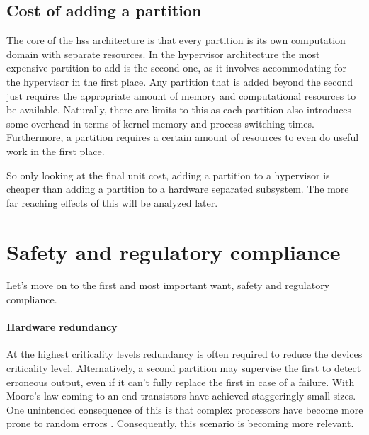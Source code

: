 \subsection{Cost of adding a partition}
The core of the \acrshort{hss} architecture is that every partition is its own computation domain with separate resources. In the hypervisor architecture the most expensive partition to add is the second one, as it involves accommodating for the hypervisor in the first place. Any partition that is added beyond the second just requires the appropriate amount of memory and computational resources to be available. Naturally, there are limits to this as each partition also introduces some overhead in terms of kernel memory and process switching times.  Furthermore, a partition requires a certain amount of resources to even do useful work in the first place.


So only looking at the final unit cost, adding a partition to a hypervisor is cheaper than adding a partition to a hardware separated subsystem. The more far reaching effects of this will be analyzed later.

\section{Safety and regulatory compliance \label{safety-analysis}}
 Let's move on to the first and most important want, safety and regulatory compliance. 
 \paragraph{Hardware redundancy}
 At the highest criticality levels redundancy is often required to reduce the devices criticality level. Alternatively, a second partition may supervise the first to detect erroneous output, even if it can't fully replace the first in case of a failure. With Moore's law coming to an end transistors have achieved staggeringly small sizes. One unintended consequence of this is that complex processors have become more prone to random errors \cite{Constantinescu.2003}. Consequently, this scenario is becoming more relevant.
 
